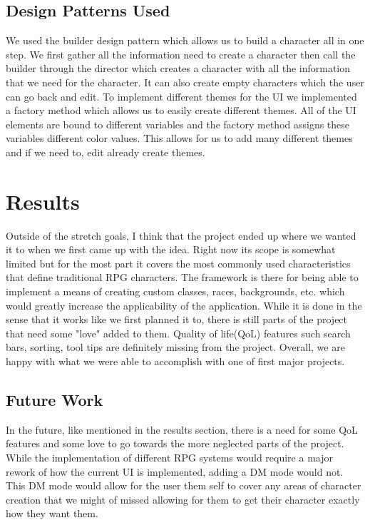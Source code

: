 \documentclass[10pt,conference,onecolumn,compsoc]{IEEEtran}
\begin{document}
\subsection{Design Patterns Used}
We used the builder design pattern which allows us to build a character all in one step. We first gather all the information need to create a character then call the builder through the director which creates a character with all the information that we need for the character. It can also create empty characters which the user can go back and edit.
To implement different themes for the UI we implemented a factory method which allows us to easily create different themes. All of the UI elements are bound to different variables and the factory method assigns these variables different color values. This allows for us to add many different themes and if we need to, edit already create themes.

\section{Results}
Outside of the stretch goals, I think that the project ended up where we wanted it to when we first came up with the idea. Right now its scope is somewhat limited but for the most part it covers the most commonly used characteristics that define traditional RPG characters. The framework is there for being able to implement a means of creating custom classes, races, backgrounds, etc. which would greatly increase the applicability of the application. While it is done in the sense that it works like we first planned it to, there is still parts of the project that need some "love" added to them. Quality of life(QoL) features such search bars, sorting, tool tips are definitely missing from the project. Overall, we are happy with what we were able to accomplish with one of first major projects.
\subsection{Future Work}
In the future, like mentioned in the results section, there is a need for some QoL features and some love to go towards the more neglected parts of the project. While the implementation of different RPG systems would require a major rework of how the current UI is implemented, adding a DM mode would not. This DM mode would allow for the user them self to cover any areas of character creation that we might of missed allowing for them to get their character exactly how they want them. 
\end{document}
